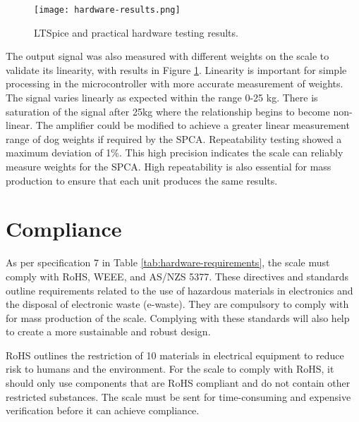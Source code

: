 \begin{figure}[!ht]
	\centering
	\texttt{[image: hardware-results.png]}
	\caption{LTSpice and practical hardware testing results.}
	\label{fig:results}
\end{figure}


The output signal was also measured with different weights on the scale to validate its linearity, with results in Figure \ref{fig:results}. Linearity is important for simple processing in the microcontroller with more accurate measurement of weights. The signal varies linearly as expected within the range 0-25 kg. There is saturation of the signal after 25kg where the relationship begins to become non-linear. The amplifier could be modified to achieve a greater linear measurement range of dog weights if required by the SPCA. Repeatability testing showed a maximum deviation of 1\%. This high precision indicates the scale can reliably measure weights for the SPCA. High repeatability is also essential for mass production to ensure that each unit produces the same results. 

\section{Compliance}

As per specification 7 in Table \ref{tab:hardware-requirements}, the scale must comply with RoHS, WEEE, and AS/NZS 5377. These directives and standards outline requirements related to the use of hazardous materials in electronics and the disposal of electronic waste (e-waste). They are compulsory to comply with for mass production of the scale. Complying with these standards will also help to create a more sustainable and robust design.

RoHS outlines the restriction of 10 materials in electrical equipment to reduce risk to humans and the environment. For the scale to comply with RoHS, it should only use components that are RoHS compliant and do not contain other restricted substances. The scale must be sent for time-consuming and expensive verification before it can achieve compliance.

